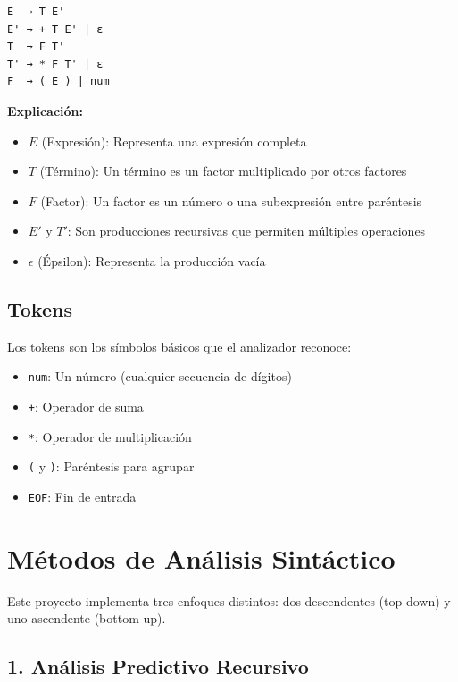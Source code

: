 \documentclass[12pt]{article}
\begin{document}
\begin{verbatim}
E  → T E'
E' → + T E' | ε
T  → F T'
T' → * F T' | ε
F  → ( E ) | num
\end{verbatim}

\textbf{Explicación:}
\begin{itemize}
    \item $E$ (Expresión): Representa una expresión completa
    \item $T$ (Término): Un término es un factor multiplicado por otros factores
    \item $F$ (Factor): Un factor es un número o una subexpresión entre paréntesis
    \item $E'$ y $T'$: Son producciones recursivas que permiten múltiples operaciones
    \item $\epsilon$ (Épsilon): Representa la producción vacía
\end{itemize}

\subsection{Tokens}

Los tokens son los símbolos básicos que el analizador reconoce:

\begin{itemize}
    \item \texttt{num}: Un número (cualquier secuencia de dígitos)
    \item \texttt{+}: Operador de suma
    \item \texttt{*}: Operador de multiplicación
    \item \texttt{(} y \texttt{)}: Paréntesis para agrupar
    \item \texttt{EOF}: Fin de entrada
\end{itemize}

\section{Métodos de Análisis Sintáctico}

Este proyecto implementa tres enfoques distintos: dos descendentes (top-down) y uno ascendente (bottom-up).

\subsection{1. Análisis Predictivo Recursivo}
\end{document}
